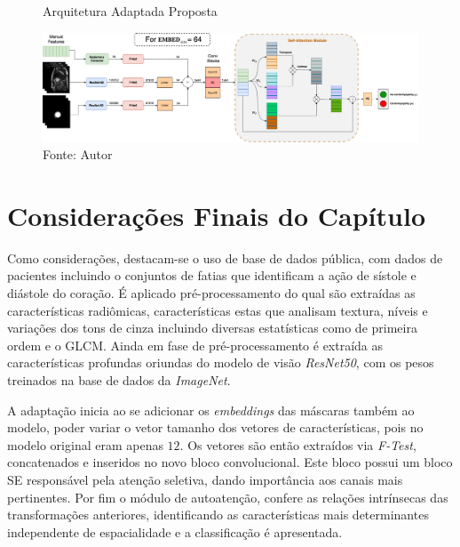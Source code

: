 \begin{figure}[htbp]
    \centering
    \caption{Arquitetura Adaptada Proposta}
    \includegraphics[scale=0.26]{figures/fig011.png}
    \caption*{Fonte: Autor}
    \label{fig:fig011}
\end{figure}

\section{Considerações Finais do Capítulo}
\label{sec:cap4_consideracoes_finais}

Como considerações, destacam-se o uso de base de dados pública, com dados de pacientes incluindo o conjuntos de fatias que identificam a ação de sístole e diástole do coração. É aplicado pré-processamento do qual são extraídas as características radiômicas, características estas que analisam textura, níveis e variações dos tons de cinza incluindo diversas estatísticas como de primeira ordem e o \gls{GLCM}. Ainda em fase de pré-processamento é extraída as características profundas oriundas do modelo de visão \textit{ResNet50}, com os pesos treinados na base de dados da \textit{ImageNet}. 

A adaptação inicia ao se adicionar os \textit{embeddings} das máscaras também ao modelo, poder variar o vetor tamanho dos vetores de características, pois no modelo original eram apenas $12$. Os vetores são então extraídos via \textit{F-Test}, concatenados e inseridos no novo bloco convolucional. Este bloco possui um bloco \gls{SE} responsável pela atenção seletiva, dando importância aos canais mais pertinentes. Por fim o módulo de autoatenção, confere as relações intrínsecas das transformações anteriores, identificando as características mais determinantes independente de espacialidade e a classificação é apresentada.
